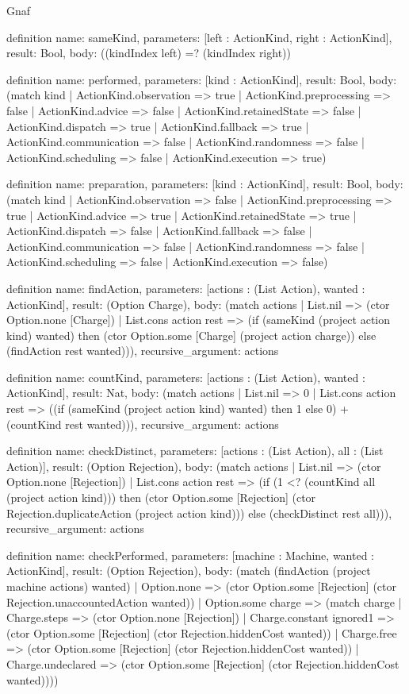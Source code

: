 \begin{lexlean}{Gnaf}
\begin{semanticmodule}
definition{
  name: sameKind,
  parameters: [left : ActionKind, right : ActionKind],
  result: Bool,
  body: ((kindIndex left) =? (kindIndex right))
}

definition{
  name: performed,
  parameters: [kind : ActionKind],
  result: Bool,
  body: (match kind
    | ActionKind.observation => true
    | ActionKind.preprocessing => false
    | ActionKind.advice => false
    | ActionKind.retainedState => false
    | ActionKind.dispatch => true
    | ActionKind.fallback => true
    | ActionKind.communication => false
    | ActionKind.randomness => false
    | ActionKind.scheduling => false
    | ActionKind.execution => true)
}

definition{
  name: preparation,
  parameters: [kind : ActionKind],
  result: Bool,
  body: (match kind
    | ActionKind.observation => false
    | ActionKind.preprocessing => true
    | ActionKind.advice => true
    | ActionKind.retainedState => true
    | ActionKind.dispatch => false
    | ActionKind.fallback => false
    | ActionKind.communication => false
    | ActionKind.randomness => false
    | ActionKind.scheduling => false
    | ActionKind.execution => false)
}

definition{
  name: findAction,
  parameters: [actions : (List Action), wanted : ActionKind],
  result: (Option Charge),
  body: (match actions
    | List.nil => (ctor Option.none [Charge])
    | List.cons action rest => (if (sameKind (project action kind) wanted) then (ctor Option.some [Charge] (project action charge)) else (findAction rest wanted))),
  recursive_argument: actions
}

definition{
  name: countKind,
  parameters: [actions : (List Action), wanted : ActionKind],
  result: Nat,
  body: (match actions
    | List.nil => 0
    | List.cons action rest => ((if (sameKind (project action kind) wanted) then 1 else 0) + (countKind rest wanted))),
  recursive_argument: actions
}

definition{
  name: checkDistinct,
  parameters: [actions : (List Action), all : (List Action)],
  result: (Option Rejection),
  body: (match actions
    | List.nil => (ctor Option.none [Rejection])
    | List.cons action rest => (if (1 <? (countKind all (project action kind))) then (ctor Option.some [Rejection] (ctor Rejection.duplicateAction (project action kind))) else (checkDistinct rest all))),
  recursive_argument: actions
}

definition{
  name: checkPerformed,
  parameters: [machine : Machine, wanted : ActionKind],
  result: (Option Rejection),
  body: (match (findAction (project machine actions) wanted)
    | Option.none => (ctor Option.some [Rejection] (ctor Rejection.unaccountedAction wanted))
    | Option.some charge => (match charge
      | Charge.steps => (ctor Option.none [Rejection])
      | Charge.constant ignored1 => (ctor Option.some [Rejection] (ctor Rejection.hiddenCost wanted))
      | Charge.free => (ctor Option.some [Rejection] (ctor Rejection.hiddenCost wanted))
      | Charge.undeclared => (ctor Option.some [Rejection] (ctor Rejection.hiddenCost wanted))))
}


\end{semanticmodule}
\end{lexlean}
